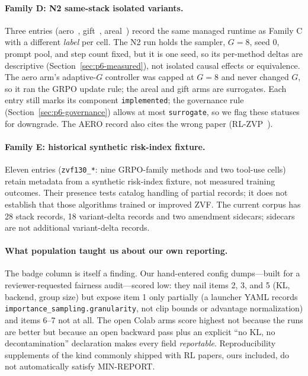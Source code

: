 \paragraph{Family D: N2 same-stack isolated variants.}
Three entries (aero~\citep{zhang2026aero}, gift~\citep{gift2025},
areal~\citep{areal2025}) record the same managed runtime as Family C with a
different \emph{label} per cell. The N2 run holds the sampler, $G{=}8$, seed 0,
prompt pool, and step count fixed, but it is one seed, so its per-method
deltas are descriptive (Section~\ref{sec:p6-measured}), not isolated causal
effects or equivalence. The aero arm's adaptive-$G$ controller was capped at
$G{=}8$ and never changed $G$, so it ran the GRPO update rule; the areal and
gift arms are surrogates. Each entry still marks its component
\texttt{implemented}; the governance rule (Section~\ref{sec:p6-governance})
allows at most \texttt{surrogate}, so we flag these statuses for downgrade.
The AERO record also cites the wrong paper (RL-ZVP~\citep{le2025rlzvp}).

\paragraph{Family E: historical synthetic risk-index fixture.}
Eleven entries (\texttt{zvf130\_*}: nine GRPO-family methods and two tool-use
cells) retain metadata from a synthetic risk-index fixture, not measured
training outcomes. Their presence tests catalog handling of partial records;
it does not establish that those algorithms trained or improved ZVF.
The current corpus has 28 stack records, 18 variant-delta records and two
amendment sidecars; sidecars are not additional variant-delta records.

\paragraph{What population taught us about our own reporting.}
The badge column is itself a finding. Our hand-entered config dumps---built for a
reviewer-requested fairness audit---scored low: they nail items 2, 3,
and 5 (KL, backend, group size) but expose item 1 only partially (a launcher
YAML records \texttt{importance_sampling.granularity}, not clip bounds or
advantage normalization) and items 6--7 not at all. The open Colab arms score
highest not because the runs are better but because an open backward pass plus an
explicit ``no KL, no decontamination'' declaration makes every field
\emph{reportable}. Reproducibility supplements of the kind commonly shipped
with RL papers, ours included, do not automatically satisfy MIN-REPORT.
